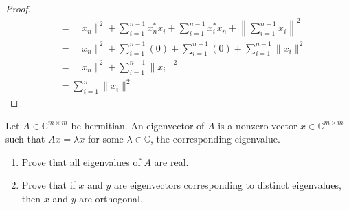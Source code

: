 \documentclass[12pt]{article}
\newenvironment{ex}[2][Exercise]{\begin{trivlist}
		\item[\hskip \labelsep {\bfseries #1}\hskip \labelsep {\bfseries #2.}]}{\end{trivlist}}
\newenvironment{sol}[1][Solution]{\begin{trivlist}
		\item[\hskip \labelsep {\bfseries #1:}]}{\end{trivlist}}
\begin{document}
\begin{sol}
\begin{enumerate}[label=(\alph*)]
\begin{proof}
\begin{align*}
				&=\lVert x_n\rVert^2 + \sum_{i=1}^{n-1}x_n^*x_i + \sum_{i=1}^{n-1}x_i^*x_n
				 + \left\lVert \sum_{i=1}^{n-1}x_i\right\rVert^2\\
				 &= \lVert x_n\rVert^2 + \sum_{i=1}^{n-1}(0) + \sum_{i=1}^{n-1}(0) +
				 \sum_{i=1}^{n-1}\lVert x_i\rVert^2\\
				 &= \lVert x_n\rVert^2  + \sum_{i=1}^{n-1}\lVert x_i\rVert^2\\
				 &= \sum_{i=1}^{n}\lVert x_i\rVert^2
			\end{align*}
		\end{proof}
	\end{enumerate}
\end{sol}

\begin{ex}{3}
	Let $A\in\mathbb{C}^{m\times m}$ be hermitian. An eigenvector of $A$ is a nonzero vector
	$x\in\mathbb{C}^{m\times m}$ such that $Ax=\lambda x$ for some $\lambda\in\mathbb{C}$, the
	corresponding eigenvalue.
	\begin{enumerate}[label=(\alph*)]
		\item Prove that all eigenvalues of $A$ are real.
		\item Prove that if $x$ and $y$ are eigenvectors corresponding to distinct eigenvalues, then
		$x$ and $y$ are orthogonal.
	\end{enumerate}
\end{ex}
\end{document}
